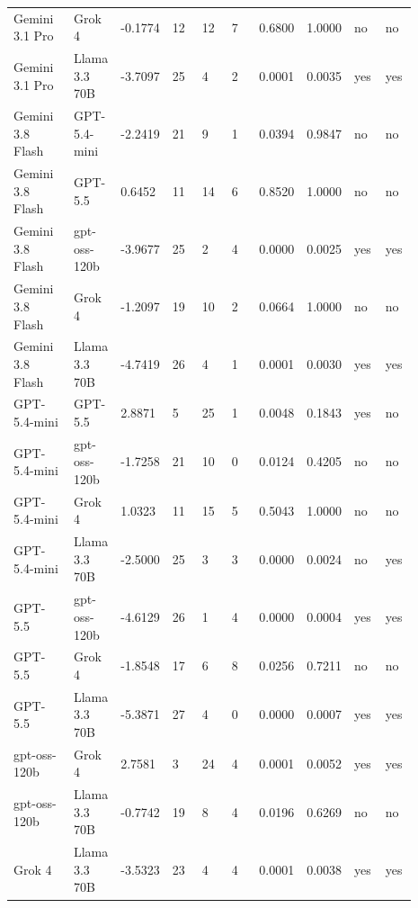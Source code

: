 \begin{landscape}
\begin{longtable}{p{0.162\linewidth}p{0.081\linewidth}p{0.081\linewidth}p{0.081\linewidth}p{0.081\linewidth}p{0.081\linewidth}p{0.081\linewidth}p{0.081\linewidth}p{0.081\linewidth}p{0.081\linewidth}}
Gemini 3.1 Pro & Grok 4 & -0.1774 & 12 & 12 & 7 & 0.6800 & 1.0000 & no & no \\
Gemini 3.1 Pro & Llama 3.3 70B & -3.7097 & 25 & 4 & 2 & 0.0001 & 0.0035 & yes & yes \\
Gemini 3.8 Flash & GPT-5.4-mini & -2.2419 & 21 & 9 & 1 & 0.0394 & 0.9847 & no & no \\
Gemini 3.8 Flash & GPT-5.5 & 0.6452 & 11 & 14 & 6 & 0.8520 & 1.0000 & no & no \\
Gemini 3.8 Flash & gpt-oss-120b & -3.9677 & 25 & 2 & 4 & 0.0000 & 0.0025 & yes & yes \\
Gemini 3.8 Flash & Grok 4 & -1.2097 & 19 & 10 & 2 & 0.0664 & 1.0000 & no & no \\
Gemini 3.8 Flash & Llama 3.3 70B & -4.7419 & 26 & 4 & 1 & 0.0001 & 0.0030 & yes & yes \\
GPT-5.4-mini & GPT-5.5 & 2.8871 & 5 & 25 & 1 & 0.0048 & 0.1843 & yes & no \\
GPT-5.4-mini & gpt-oss-120b & -1.7258 & 21 & 10 & 0 & 0.0124 & 0.4205 & no & no \\
GPT-5.4-mini & Grok 4 & 1.0323 & 11 & 15 & 5 & 0.5043 & 1.0000 & no & no \\
GPT-5.4-mini & Llama 3.3 70B & -2.5000 & 25 & 3 & 3 & 0.0000 & 0.0024 & no & yes \\
GPT-5.5 & gpt-oss-120b & -4.6129 & 26 & 1 & 4 & 0.0000 & 0.0004 & yes & yes \\
GPT-5.5 & Grok 4 & -1.8548 & 17 & 6 & 8 & 0.0256 & 0.7211 & no & no \\
GPT-5.5 & Llama 3.3 70B & -5.3871 & 27 & 4 & 0 & 0.0000 & 0.0007 & yes & yes \\
gpt-oss-120b & Grok 4 & 2.7581 & 3 & 24 & 4 & 0.0001 & 0.0052 & yes & yes \\
gpt-oss-120b & Llama 3.3 70B & -0.7742 & 19 & 8 & 4 & 0.0196 & 0.6269 & no & no \\
Grok 4 & Llama 3.3 70B & -3.5323 & 23 & 4 & 4 & 0.0001 & 0.0038 & yes & yes \\
\bottomrule
\end{longtable}
\normalsize
\end{landscape}
